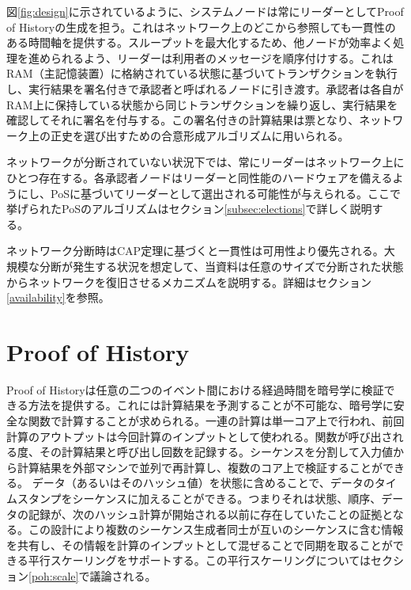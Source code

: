 \documentclass[12pt]{ltjsarticle}
\begin{document}
図\ref{fig:design}に示されているように、システムノードは常にリーダーとしてProof of Historyの生成を担う。これはネットワーク上のどこから参照しても一貫性のある時間軸を提供する。スループットを最大化するため、他ノードが効率よく処理を進められるよう、リーダーは利用者のメッセージを順序付けする。これはRAM（主記憶装置）に格納されている状態に基づいてトランザクションを執行し、実行結果を署名付きで承認者と呼ばれるノードに引き渡す。承認者は各自がRAM上に保持している状態から同じトランザクションを繰り返し、実行結果を確認してそれに署名を付与する。この署名付きの計算結果は票となり、ネットワーク上の正史を選び出すための合意形成アルゴリズムに用いられる。

ネットワークが分断されていない状況下では、常にリーダーはネットワーク上にひとつ存在する。各承認者ノードはリーダーと同性能のハードウェアを備えるようにし、PoSに基づいてリーダーとして選出される可能性が与えられる。ここで挙げられたPoSのアルゴリズムはセクション\ref{subsec:elections}で詳しく説明する。

ネットワーク分断時はCAP定理に基づくと一貫性は可用性より優先される。大規模な分断が発生する状況を想定して、当資料は任意のサイズで分断された状態からネットワークを復旧させるメカニズムを説明する。詳細はセクション\ref{availability}を参照。

\section{Proof of History}\label{proof_of_history}
Proof of Historyは任意の二つのイベント間における経過時間を暗号学に検証できる方法を提供する。これには計算結果を予測することが不可能な、暗号学に安全な関数で計算することが求められる。一連の計算は単一コア上で行われ、前回計算のアウトプットは今回計算のインプットとして使われる。関数が呼び出される度、その計算結果と呼び出し回数を記録する。シーケンスを分割して入力値から計算結果を外部マシンで並列で再計算し、複数のコア上で検証することができる。
データ（あるいはそのハッシュ値）を状態に含めることで、データのタイムスタンプをシーケンスに加えることができる。つまりそれは状態、順序、データの記録が、次のハッシュ計算が開始される以前に存在していたことの証拠となる。この設計により複数のシーケンス生成者同士が互いのシーケンスに含む情報を共有し、その情報を計算のインプットとして混ぜることで同期を取ることができる平行スケーリングをサポートする。この平行スケーリングについてはセクション\ref{poh:scale}で議論される。
\end{document}
